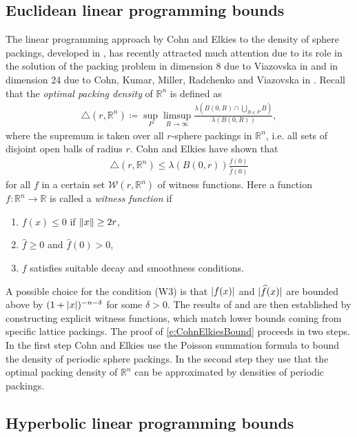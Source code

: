 \documentclass[12pt,reqno,a4paper]{amsart}
\theoremstyle{theorem}
\theoremstyle{definition}
\numberwithin{theorem}{section}
\numberwithin{equation}{section}
\newcommand{\R}{\mathbb{R}}
\DeclarePairedDelimiter{\norm}{\lVert}{\rVert}
\DeclarePairedDelimiter{\abs}{\lvert}{\rvert}
\begin{document}
\subsection{Euclidean linear programming bounds}
The linear programming approach by Cohn and Elkies to the density of sphere packings, developed in \cite{CohnElkies2003}, has recently attracted much attention due to its role in the solution of the packing problem in dimension 8 due to Viazovska in \cite{ViazovskaDim8} and in dimension 24 due to Cohn, Kumar, Miller, Radchenko and Viazovska in \cite{ViazovskaDim24}.
Recall that the \emph{optimal packing density} of $\R^n$ is defined as
\begin{align}\label{e:definition_euclidean_optimal_density}
	\triangle(r, \R^n)\coloneqq  \sup_P \limsup_{R\to \infty}\frac{\lambda(B(0,R)\cap \bigcup_{B\in P}B)}{\lambda(B(0,R))},
\end{align}
where the supremum is taken over all $r$-sphere packings in $\R^n$, i.e. all sets of disjoint open balls of radius $r$.
Cohn and Elkies have shown that
\begin{align}\label{e:CohnElkiesBound}
	\triangle(r,\R^n)\leq \lambda(B(0,r))\frac{f(0)}{\widehat{f}(0)}
\end{align}
for all $f$ in a certain set $\mathcal{W}(r,\R^n)$ of witness functions. Here a function $f:\R^n\to \R$  is called a \emph{witness function} if 
\begin{enumerate}[(W1)]
	\item $f(x)\leq 0$ if $\norm{x}\geq 2r$,
	\item $\widehat{f}\geq 0$ and $\widehat{f}(0)>0$,
	\item $f$ satisfies suitable decay and smoothness conditions.
\end{enumerate}
A possible choice for the condition (W3) is that $\abs{f(x)}$ and $\abs{\widehat{f}(x)}$ are bounded above by $(1+\abs{x})^{-n-\delta}$ for some $\delta>0$. The results of \cite{ViazovskaDim8} and \cite{ViazovskaDim24} are then established by constructing explicit witness functions, which match lower bounds coming from specific lattice packings. The proof of \eqref{e:CohnElkiesBound} proceeds in two steps. In the first step Cohn and Elkies use the Poisson summation formula to bound the density of periodic sphere packings. In the second step they use that the optimal packing density of $\R^n$ can be approximated by densities of periodic packings.


\subsection{Hyperbolic linear programming bounds}
\end{document}
